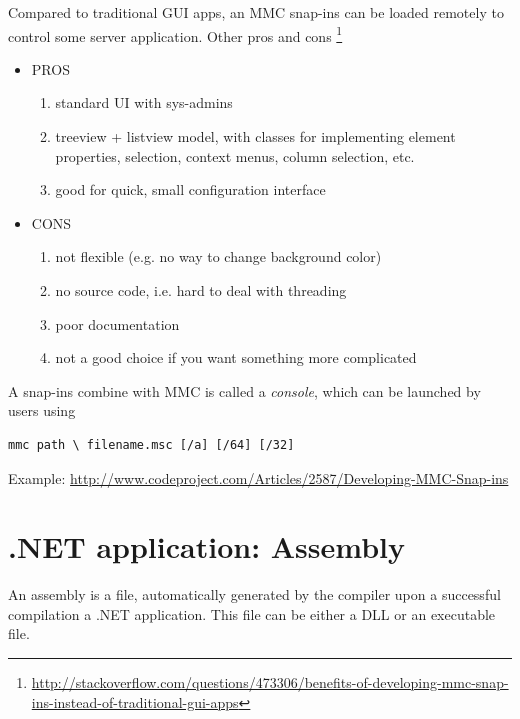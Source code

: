 Compared to traditional GUI apps, an MMC snap-ins can be loaded remotely to
control some server application. Other pros and cons
\footnote{\url{http://stackoverflow.com/questions/473306/benefits-of-developing-mmc-snap-ins-instead-of-traditional-gui-apps}}
\begin{itemize}
  \item PROS
  \begin{enumerate}
    \item standard UI with sys-admins
    \item treeview + listview model, with classes for implementing element
    properties, selection, context menus, column selection, etc.
    \item good for quick, small configuration interface
  \end{enumerate}
  \item CONS
  \begin{enumerate}
    \item not flexible (e.g. no way to change background color)
    \item no source code, i.e. hard to deal with threading
    \item poor documentation
    \item not a good choice if you want something more complicated
  \end{enumerate}
\end{itemize}

A snap-ins combine with MMC is called a {\it console}, which can be launched by
users using
\begin{verbatim}
mmc path \ filename.msc [/a] [/64] [/32]
\end{verbatim}

Example: \url{http://www.codeproject.com/Articles/2587/Developing-MMC-Snap-ins}


% 
% 


\section{.NET application: Assembly}

An assembly is a file, automatically generated by the compiler upon a successful
compilation a .NET application. This file can be either a DLL or an executable
file.

